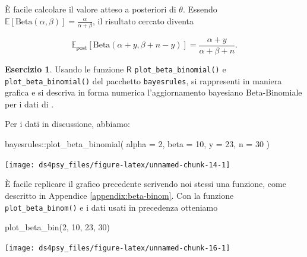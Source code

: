 \documentclass[
  11pt,
]{krantz}
\makeatletter
\newenvironment{Shaded}{\begin{snugshade}}{\end{snugshade}}
\newcommand{\AttributeTok}[1]{\textcolor[rgb]{0.61,0.61,0.61}{#1}}
\newcommand{\DecValTok}[1]{\textcolor[rgb]{0.06,0.06,0.06}{#1}}
\newcommand{\FunctionTok}[1]{\textcolor[rgb]{0,0,0}{#1}}
\newcommand{\NormalTok}[1]{#1}
\newcommand{\SpecialCharTok}[1]{\textcolor[rgb]{0,0,0}{#1}}
\newenvironment{kframe}{%
\medskip{}
\setlength{\fboxsep}{.8em}
 \def\at@end@of@kframe{}%
 \ifinner\ifhmode%
  \def\at@end@of@kframe{\end{minipage}}%
  \begin{minipage}{\columnwidth}%
 \fi\fi%
 \def\FrameCommand##1{\hskip\@totalleftmargin \hskip-\fboxsep
 \colorbox{shadecolor}{##1}\hskip-\fboxsep
     \hskip-\linewidth \hskip-\@totalleftmargin \hskip\columnwidth}%
 \MakeFramed {\advance\hsize-\width
   \@totalleftmargin\z@ \linewidth\hsize
   \@setminipage}}%
 {\par\unskip\endMakeFramed%
 \at@end@of@kframe}
\renewenvironment{Shaded}{\begin{kframe}}{\end{kframe}}
\newcommand{\E}{\mathbb{E}} %
\newcommand{\R}{\textsf{R}} %
\theoremstyle{definition}
\theoremstyle{definition}
\theoremstyle{definition}
\newtheorem{exercise}{Esercizio}[chapter]
\theoremstyle{definition}
\theoremstyle{remark}
\makeatother
\begin{document}
È facile calcolare il valore atteso a posteriori di \(\theta\). Essendo \(\E[\mbox{Beta}(\alpha, \beta)] = \frac{\alpha}{\alpha + \beta}\), il risultato cercato diventa

\begin{equation}
\E_{\text{post}} [\mathrm{Beta}(\alpha + y, \beta + n - y)] = \frac{\alpha + y}{\alpha + \beta +n}.
\label{eq:ev-post-beta-bin-1}
\end{equation}

\begin{exercise}

Usando le funzione \(\R\) \texttt{plot\_beta\_binomial()} e \texttt{plot\_beta\_binomial()} del pacchetto \texttt{bayesrules}, si rappresenti in maniera grafica e si descriva in forma numerica l'aggiornamento bayesiano Beta-Binomiale per i dati di \citet{zetschefuture2019}.

Per i dati in discussione, abbiamo:

\begin{Shaded}
\begin{Highlighting}[]
\NormalTok{bayesrules}\SpecialCharTok{::}\FunctionTok{plot\_beta\_binomial}\NormalTok{(}
  \AttributeTok{alpha =} \DecValTok{2}\NormalTok{, }\AttributeTok{beta =} \DecValTok{10}\NormalTok{, }\AttributeTok{y =} \DecValTok{23}\NormalTok{, }\AttributeTok{n =} \DecValTok{30}
\NormalTok{  ) }
\end{Highlighting}
\end{Shaded}

\begin{center}\texttt{[image: ds4psy\_files/figure-latex/unnamed-chunk-14-1]} \end{center}

È facile replicare il grafico precedente scrivendo noi stessi una funzione, come descritto in Appendice \ref{appendix:beta-binom}. Con la funzione \texttt{plot\_beta\_binom()} e i dati usati in precedenza otteniamo

\begin{Shaded}
\begin{Highlighting}[]
\FunctionTok{plot\_beta\_bin}\NormalTok{(}\DecValTok{2}\NormalTok{, }\DecValTok{10}\NormalTok{, }\DecValTok{23}\NormalTok{, }\DecValTok{30}\NormalTok{)}
\end{Highlighting}
\end{Shaded}

\begin{center}\texttt{[image: ds4psy\_files/figure-latex/unnamed-chunk-16-1]} \end{center}


\end{exercise}
\end{document}
